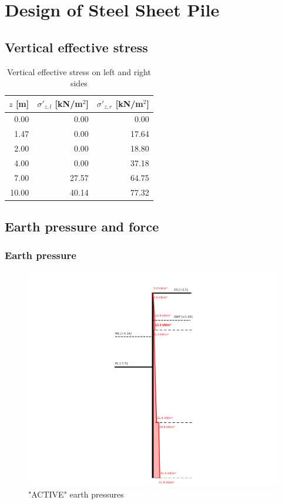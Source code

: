\chapter{Design of Steel Sheet Pile}

\section{Vertical effective stress}

\begin{table}[H]
  \centering
  \caption{Vertical effective stress on left and right sides}
  \label{tab:appendix_effective_stress}
  \small
  \setlength{\tabcolsep}{8pt}
  \renewcommand{\arraystretch}{1.15}
  \begin{tabular}{@{}r r r@{}}
    \toprule
    $z$ [m] &
    $\sigma'_{z,l}$ [kN/m$^2$] &
    $\sigma'_{z,r}$ [kN/m$^2$] \\
    \midrule
     0.00 &  0.00 &  0.00 \\
     1.47 &  0.00 & 17.64 \\
     2.00 &  0.00 & 18.80 \\
     4.00 &  0.00 & 37.18 \\
     7.00 & 27.57 & 64.75 \\
    10.00 & 40.14 & 77.32 \\
    \bottomrule
  \end{tabular}
\end{table}

\section{Earth pressure and force}
\label{appendix:earth_pressure}

\subsection{Earth pressure}

\begin{figure}[H]
    \centering
    \includegraphics[width=0.75\linewidth]{figures/appendix-i/active_earth_pressure.png}
    \caption{"ACTIVE" earth pressures}
    \label{fig:appendix_earth_pressure}
\end{figure}

